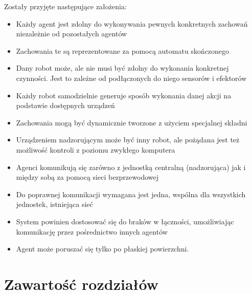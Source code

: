 Zostały przyjęte następujące założenia:
\begin{itemize}
  \item Każdy agent jest zdolny do wykonywania pewnych konkretnych zachowań niezależnie od pozostałych agentów
  \item Zachowania te są reprezentowane za pomocą automatu skończonego
  \item Dany robot może, ale nie musi być zdolny do wykonania konkretnej czynności. Jest to zależne od podłączonych do niego sensorów i efektorów
  \item Każdy robot samodzielnie generuje sposób wykonania danej akcji na podstawie dostępnych urządzeń
  \item Zachowania mogą być dynamicznie tworzone z użyciem specjalnej składni
  \item Urządzeniem nadzorującym może być inny robot, ale pożądana jest też możliwość kontroli z poziomu zwykłego komputera
  \item Agenci komunikują się zarówno z jednostką centralną (nadzorująca) jak i między sobą za pomocą sieci bezprzewodowej
  \item Do poprawnej komunikacji wymagana jest jedna, wspólna dla wszystkich jednostek, istniejąca sieć
  \item System powinien dostosować się do braków w łączności, umożliwiając komunikację przez pośrednictwo innych agentów
  \item Agent może poruszać się tylko po płaskiej powierzchni.
\end{itemize}

%

\section{Zawartość rozdziałów}

